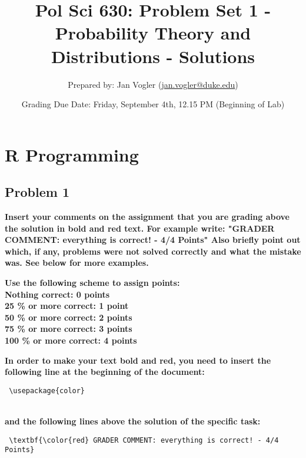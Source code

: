 \documentclass[12pt,letter]{article}\usepackage[]{graphicx}\usepackage[]{color}
\begin{document}
\title{Pol Sci 630: Problem Set 1 - Probability Theory and Distributions - Solutions}

\author{Prepared by: Jan Vogler (\href{mailto:jan.vogler@duke.edu}{jan.vogler@duke.edu})}

\date{Grading Due Date: Friday, September 4th, 12.15 PM (Beginning of Lab)}
 
\maketitle 



\section*{R Programming}

\subsection*{Problem 1}

\textbf{\color{red} Insert your comments on the assignment that you are grading above the solution in bold and red text. For example write: "GRADER COMMENT: everything is correct! - 4/4 Points" Also briefly point out which, if any, problems were not solved correctly and what the mistake was. See below for more examples.}

\bigskip

\textbf{Use the following scheme to assign points: \\
Nothing correct: 0 points \\ 
25 \% or more correct: 1 point \\
50 \% or more correct: 2 points \\
75 \% or more correct: 3 points \\
100 \% or more correct: 4 points}

\bigskip

\textbf{In order to make your text bold and red, you need to insert the following line at the beginning of the document:}

\begin{verbatim} \usepackage{color} \end{verbatim}

\\ \textbf{and the following lines above the solution of the specific task:}

\begin{verbatim} \textbf{\color{red} GRADER COMMENT: everything is correct! - 4/4 Points} \end{verbatim}
\end{document}
